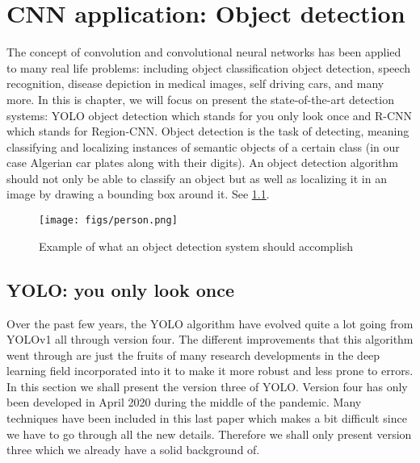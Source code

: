 \chapter{CNN application: Object detection}
The concept of convolution and convolutional neural networks has been applied to many real life problems: including object classification
object detection, speech recognition, disease depiction in medical images, self driving cars, and many more.
In this is chapter, we will focus on present the state-of-the-art detection systems: YOLO object detection which stands for you only look once
and R-CNN which stands for Region-CNN.
Object detection is the task of detecting, meaning classifying and localizing instances of semantic objects of a certain class (in our
case Algerian car plates along with their digits). An object detection algorithm should not only be able to classify an object but as well as
localizing it in an image by drawing a bounding box around it. See \cref{fig:detection}.

\begin{figure}[!htbp]
  \centering
  \texttt{[image: figs/person.png]}
  \caption{Example of what an object detection system should accomplish}\label{fig:detection}
\end{figure}

\section{YOLO: you only look once}
Over the past few years, the YOLO algorithm have evolved quite a lot going from YOLOv1 all through version four. The different
improvements that this algorithm went through are just the fruits of many research developments in the deep learning field incorporated into it to
make it more robust and less prone to errors. In this section we shall present the version three of YOLO. Version four has only been developed in
April 2020 during the middle of the pandemic. Many techniques have been included in this last paper which makes a bit difficult since we have to go
through all the new details. Therefore we shall only present version three which we already have a solid background of.

